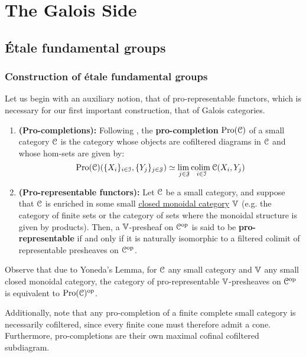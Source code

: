 \section{The Galois Side}
    \subsection{\'Etale fundamental groups}
        \subsubsection{Construction of \'etale fundamental groups}
            Let us begin with an auxiliary notion, that of pro-representable functors, which is necessary for our first important construction, that of Galois categories.
            \begin{definition} \label{def: pro_representable_functors}
                \noindent
                \begin{enumerate}
                    \item \textbf{(Pro-completions):} Following \cite[Definition 2.1]{isaksen_2001_limits_and_colimits_in_pro_categories}, the \textbf{pro-completion} $\mathrm{Pro}(\mathcal{C})$ of a small category $\mathcal{C}$ is the category whose objects are cofiltered diagrams in $\mathcal{C}$ and whose hom-sets are given by:
                        $$\mathrm{Pro}(\mathcal{C})(\{X_i\}_{i \in \mathcal{I}}, \{Y_j\}_{j \in \mathcal{J}}) \simeq \underset{j \in \mathcal{J}}{\operatorname{lim} \:} \underset{i \in \mathcal{I}}{\operatorname{colim} \:} \mathcal{C}(X_i, Y_j)$$
                    \item \textbf{(Pro-representable functors):} Let $\mathcal{C}$ be a small category, and suppose that $\mathcal{C}$ is enriched in some small \href{http://nlab-pages.s3.us-east-2.amazonaws.com/nlab/show/closed+monoidal+category}{\underline{closed monoidal category}} $\mathbb{V}$ (e.g. the category of finite sets or the category of sets where the monoidal structure is given by products). Then, a $\mathbb{V}$-presheaf on $\mathcal{C}^{\mathrm{op}}$ is said to be \textbf{pro-representable} if and only if it is naturally isomorphic to a filtered colimit of representable presheaves on $\mathcal{C}^{\mathrm{op}}$.
                \end{enumerate}
            \end{definition}
            \begin{remark} \label{remark: pro_representable_functors_are_ind_objects}
                Observe that due to Yoneda's Lemma, for $\mathcal{C}$ any small category and $\mathbb{V}$ any small closed monoidal category, the category of pro-representable $\mathbb{V}$-presheaves on $\mathcal{C}^{\mathrm{op}}$ is equivalent to $\mathrm{Pro}(\mathcal{C})^{\mathrm{op}}$.
                
                Additionally, note that any pro-completion of a finite complete small category is necessarily cofiltered, since every finite cone must therefore admit a cone. Furthermore, pro-completions are their own maximal cofinal cofiltered subdiagram.
            \end{remark}
            
